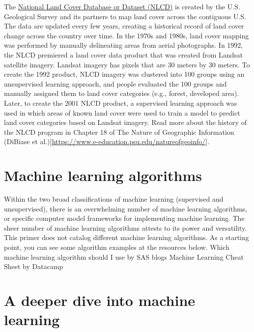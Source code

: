 \documentclass[
]{book}
\begin{document}
The \href{https://www.usgs.gov/centers/eros/science/national-land-cover-database}{National Land Cover Database or Dataset (NLCD)} is created by the U.S. Geological Survey and its partners to map land cover across the contiguous U.S. The data are updated every few years, creating a historical record of land cover change across the country over time. In the 1970s and 1980s, land cover mapping was performed by manually delineating areas from aerial photographs. In 1992, the NLCD premiered a land cover data product that was created from Landsat satellite imagery. Landsat imagery has pixels that are 30 meters by 30 meters. To create the 1992 product, NLCD imagery was clustered into 100 groups using an unsupervised learning approach, and people evaluated the 100 groups and manually assigned them to land cover categories (e.g., forest, developed area). Later, to create the 2001 NLCD product, a supervised learning approach was used in which areas of known land cover were used to train a model to predict land cover categories based on Landsat imagery. Read more about the history of the NLCD program in Chapter 18 of The Nature of Geographic Information (DiBiase et al.){[}\url{https://www.e-education.psu.edu/natureofgeoinfo/}{]}.

\hypertarget{machine-learning-algorithms}{%
\section{Machine learning algorithms}\label{machine-learning-algorithms}}

Within the two broad classifications of machine learning (supervised and unsupervised), there is an overwhelming number of machine learning algorithms, or specific computer model frameworks for implementing machine learning. The sheer number of machine learning algorithms attests to its power and versatility. This primer does not catalog different machine learning algorithms. As a starting point, you can see some algorithm examples at the resources below.
Which machine learning algorithm should I use by SAS blogs
Machine Learning Cheat Sheet by Datacamp

\hypertarget{a-deeper-dive-into-machine-learning}{%
\section{A deeper dive into machine learning}\label{a-deeper-dive-into-machine-learning}}
\end{document}
